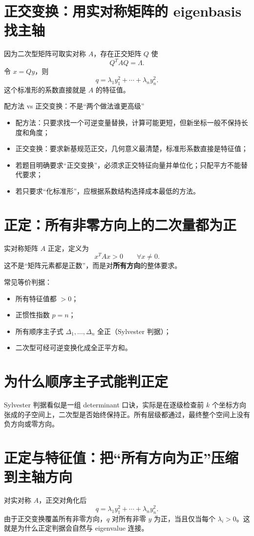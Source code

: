 \documentclass[11pt,a4paper,openany]{ctexbook}
\newcommand{\key}[1]{\textbf{\color{deep}#1}}
\begin{document}
\section{正交变换：用实对称矩阵的 eigenbasis 找主轴}
因为二次型矩阵可取实对称 $A$，存在正交矩阵 $Q$ 使
\[
Q^TAQ=\Lambda.
\]
令 $x=Qy$，则
\[
q=\lambda_1y_1^2+\cdots+\lambda_ny_n^2.
\]
这个标准形的系数直接就是 $A$ 的特征值。

\begin{methodbox}{配方法 vs 正交变换：不是“两个做法谁更高级”}
\begin{itemize}
  \item 配方法：只要求找一个可逆变量替换，计算可能更短，但新坐标一般不保持长度和角度；
  \item 正交变换：要求新基规范正交，几何意义最清楚，标准形系数直接是特征值；
  \item 若题目明确要求“正交变换”，必须求正交特征向量并单位化；只配平方不能替代要求；
  \item 若只要求“化标准形”，应根据系数结构选择成本最低的方法。
\end{itemize}
\end{methodbox}

\section{正定：所有非零方向上的二次量都为正}
实对称矩阵 $A$ 正定，定义为
\[
\boxed{x^TAx>0\qquad \forall x\neq0.}
\]
这不是“矩阵元素都是正数”，而是对\key{所有方向}的整体要求。

常见等价判据：
\begin{itemize}
  \item 所有特征值都 $>0$；
  \item 正惯性指数 $p=n$；
  \item 所有顺序主子式 $\Delta_1,\dots,\Delta_n$ 全正（Sylvester 判据）；
  \item 二次型可经可逆变换化成全正平方和。
\end{itemize}

\section{为什么顺序主子式能判正定}
Sylvester 判据看似是一组 determinant 口诀，实际是在逐级检查前 $k$ 个坐标方向张成的子空间上，二次型是否始终保持正。所有层级都通过，最终整个空间上没有负方向或零方向。

\section{正定与特征值：把“所有方向为正”压缩到主轴方向}
对实对称 $A$，正交对角化后
\[
q=\lambda_1y_1^2+\cdots+\lambda_ny_n^2.
\]
由于正交变换覆盖所有非零方向，$q$ 对所有非零 $y$ 为正，当且仅当每个 $\lambda_i>0$。这就是为什么正定判据会自然与 eigenvalue 连接。
\end{document}
